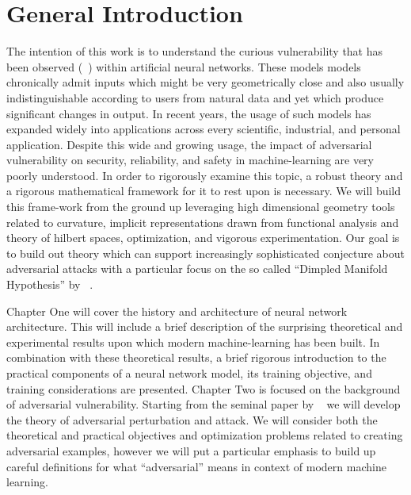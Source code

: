 \chapter{General Introduction} %
\label{Chapter1} %

The intention of this work is to understand the curious vulnerability
that has been observed (~\cite{szegedy2013}) within artificial neural
networks. These models models chronically admit inputs which might be
very geometrically close and also usually indistinguishable according
to users from natural data and yet which produce significant changes
in output. In recent years, the usage of such models has expanded
widely into applications across every scientific, industrial, and
personal application. Despite this wide and growing usage,
the impact of adversarial vulnerability on security, reliability, and
safety in machine-learning are very poorly understood. In order to
rigorously examine this topic, a robust theory and a rigorous
mathematical framework for it to rest upon is necessary. We will build
this frame-work from the ground up leveraging high dimensional
geometry tools related to curvature, implicit representations drawn
from functional analysis and theory of hilbert spaces, optimization,
and vigorous experimentation. Our goal is to build out theory which
can support increasingly sophisticated conjecture about adversarial
attacks with a particular focus on the so called ``Dimpled Manifold
Hypothesis'' by ~\cite{shamir2021dimpled}.

Chapter One will cover the history and architecture of neural network
architecture. This will include a brief description of the surprising
theoretical and experimental results upon which modern
machine-learning has been built. In combination with these theoretical
results, a brief rigorous introduction to the practical components of
a neural network model, its training objective, and training
considerations are presented. Chapter Two is focused on the background
of adversarial vulnerability. Starting from the seminal paper by
~\cite{szegedy2013} we will develop the theory of adversarial
perturbation and attack. We will consider both the theoretical and
practical objectives and optimization problems related to creating
adversarial examples, however we will put a particular emphasis to
build up careful definitions for what ``adversarial'' means in context
of modern machine learning.


